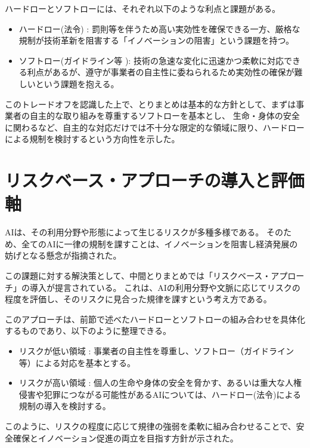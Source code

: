 ハードローとソフトローには、それぞれ以下のような利点と課題がある。

\begin{itemize}
    \item ハードロー(法令) : 罰則等を伴うため高い実効性を確保できる一方、厳格な規制が技術革新を阻害する「イノベーションの阻害」という課題を持つ。
    \item ソフトロー(ガイドライン等 ): 技術の急速な変化に迅速かつ柔軟に対応できる利点があるが、遵守が事業者の自主性に委ねられるため実効性の確保が難しいという課題を抱える。
\end{itemize}

このトレードオフを認識した上で、とりまとめは基本的な方針として、まずは事業者の自主的な取り組みを尊重するソフトローを基本とし、
生命・身体の安全に関わるなど、自主的な対応だけでは不十分な限定的な領域に限り、ハードローによる規制を検討するという方向性を示した。


\section{リスクベース・アプローチの導入と評価軸}
AIは、その利用分野や形態によって生じるリスクが多種多様である。
そのため、全てのAIに一律の規制を課すことは、イノベーションを阻害し経済発展の妨げとなる懸念が指摘された。

この課題に対する解決策として、中間とりまとめでは「リスクベース・アプローチ」の導入が提言されている。
これは、AIの利用分野や文脈に応じてリスクの程度を評価し、そのリスクに見合った規律を課すという考え方である。

このアプローチは、前節で述べたハードローとソフトローの組み合わせを具体化するものであり、以下のように整理できる。

\begin{itemize}
    \item リスクが低い領域 : 事業者の自主性を尊重し、ソフトロー（ガイドライン等）による対応を基本とする。
    \item リスクが高い領域 : 個人の生命や身体の安全を脅かす、あるいは重大な人権侵害や犯罪につながる可能性があるAIについては、ハードロー(法令)による規制の導入を検討する。
\end{itemize}

このように、リスクの程度に応じて規律の強弱を柔軟に組み合わせることで、安全確保とイノベーション促進の両立を目指す方針が示された。
